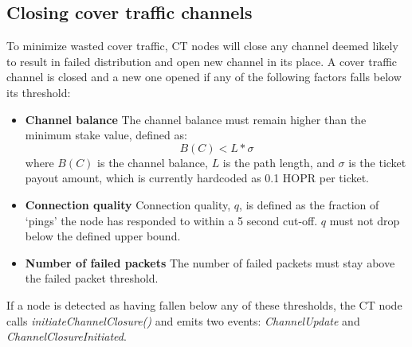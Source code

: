 \subsection{Closing cover traffic channels}
\label{sec:ct:channelclose}

To minimize wasted cover traffic, CT nodes will close any channel deemed likely to result in failed distribution and open new channel in its place. A cover traffic channel is closed and a new one opened if any of the following factors falls below its threshold:

\begin{itemize}
    \item \textbf{Channel balance} The channel balance must remain higher than the minimum stake value, defined as:
          $$B(C) < L * \sigma$$
          where $B(C)$ is the channel balance, $L$ is the path length, and $\sigma$ is the ticket payout amount, which is currently hardcoded as 0.1 HOPR per ticket.
    \item \textbf{Connection quality} Connection quality, $q$, is defined as the fraction of `pings' the node has responded to within a 5 second cut-off. $q$ must not drop below the defined upper bound.
    \item \textbf{Number of failed packets} The number of failed packets must stay above the failed packet threshold.
          $$ $$
\end{itemize}

If a node is detected as having fallen below any of these thresholds, the CT node calls \textit{initiateChannelClosure()} and emits two events: \textit{ChannelUpdate} and \textit{ChannelClosureInitiated}.